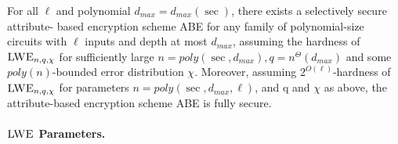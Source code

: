 \begin{corollary}
For all $\ell$ and polynomial $d_{max} = d_{max}(\sec)$, there exists a selectively secure attribute-
based encryption scheme ABE for any family of polynomial-size circuits with $\ell$ inputs and depth at
most $d_{max}$, assuming the hardness of $\textsc{LWE}_{n,q,\chi}$ for sufficiently large $n = poly(\sec, d_{max}), q = n^\Theta(d_{max})$ and some $poly(n)$-bounded error distribution $\chi$.
Moreover, assuming $2^{O(\ell)}$-hardness of $\textsc{LWE}_{n,q,\chi}$ for parameters $n = poly(\sec, d_{max},\ell)$, and q and $\chi$ as above, the attribute-based encryption scheme ABE is fully secure.
\end{corollary}


\paragraph{$\textsc{LWE}$ Parameters. }

